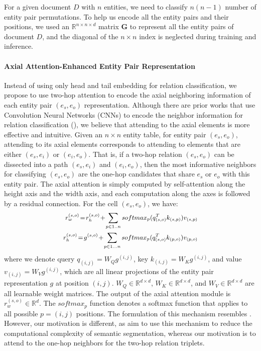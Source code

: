 \documentclass[11pt]{article}
\begin{document}
For a given document $D$ with $n$ entities, we need to classify $n(n-1)$ number of entity pair permutations. To help us encode all the entity pairs and their positions, we used an $\mathbb{R}^{{n}\times{n}\times{d}}$ matrix $\mathbf{G}$ to represent all the entity pairs of document $D$, and the diagonal of the ${n}\times{n}$ index is neglected during training and inference.



\paragraph{Axial Attention-Enhanced Entity Pair Representation} Instead of using only head and tail embedding for relation classification, we propose to use two-hop attention to encode the axial neighboring information of each entity pair $(e_s, e_o)$ representation. Although there are prior works that use Convolution Neural Networks (CNNs) to encode the neighbor information for relation classification (\citealp{zhang2021document}), we believe that attending to the axial elements is more effective and intuitive. Given an ${n}\times{n}$ entity table, for entity pair $(e_s, e_o)$, attending to its axial elements corresponds to attending to elements that are either $(e_s, e_i)$ or $(e_i, e_o)$. That is, if a two-hop relation $(e_s, e_o)$ can be dissected into a path $(e_s, e_i)$ and $(e_i, e_o)$, then the most informative neighbors for classifying $(e_s, e_o)$ are the one-hop candidates that share $e_{s}$ or $e_{o}$ with this entity pair. 
The axial attention is simply computed by self-attention along the height axis and the width axis, and each computation along the axes is followed by a residual connection. For the cell $(e_{s}, e_{o})$, we have:
\begin{equation}\small
\begin{split}
        r^{(s, o)}_{w}\!=\!r^{(s,o)}_{h}\!+\!
    \sum_{{p}\in{1..n}}{softmax_{p}}({q}_{(s, o)}^{T}k_{(s, p)})v_{(s, p)} \\
    r^{(s, o)}_{h}\!=\!g^{(s,o)}\!+\!
    \sum_{{p}\in{1...n}}{softmax_{p}}({q}_{(s, o)}^{T}k_{(p, o)})v_{(p, o)}
\end{split}
\end{equation}
where we denote query ${q}_{(i, j)} = W_{Q}g^{(i, j)}$, key ${k}_{(i, j)} = W_{K}g^{(i, j)}$, and value ${v}_{(i, j)} = W_{V}g^{(i, j)}$, which are all linear projections of the entity pair representation $g$ at position $(i, j)$. $W_{Q} \in \mathbb{R}^{{d}\times{d}}$, $W_{K} \in \mathbb{R}^{{d}\times{d}}$, and $W_{V} \in \mathbb{R}^{{d}\times{d}}$ are all learnable weight matrices. The output of the axial attention module is $r^{(s, o)}_{w} \in \mathbb{R}^d$. The $softmax_{p}$ function denotes a softmax function that applies to all possible $p = (i, j)$ positions. The formulation of this mechanism resembles \citet{wang2020axial}. However, our motivation is different, as \citet{wang2020axial} aim to use this mechanism to reduce the computational complexity of semantic segmentation, whereas our motivation is to attend to the one-hop neighbors for the two-hop relation triplets. 
 
\end{document}
